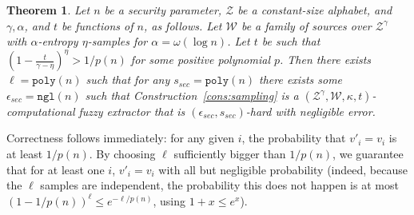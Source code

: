 \documentclass[11pt]{article}
\newtheorem{theorem}{Theorem}[section]
\newcommand{\consref}[1]{\mbox{Construction~\ref{#1}}}
\newcommand{\poly}{\ensuremath{\mathtt{poly}}\xspace}
\newcommand{\ngl}{\ensuremath{\mathtt{ngl}}\xspace}
\newcommand{\Huse}{\mathrm{H}_{\mathtt{usable}}}
\newcommand{\subsetEntropy}{\alpha}
\begin{document}
\noindent


\begin{theorem}
\label{thm:sampling}
Let $n$ be a security parameter, $\mathcal{Z}$ be a constant-size alphabet, and $\gamma, \subsetEntropy$, and $t$ be functions of $n$, as follows.  Let $\mathcal{W}$ be a family of sources over $\mathcal{Z}^\gamma$ with $\alpha$-entropy $\eta$-samples for $\subsetEntropy = \omega(\log n)$. Let $t$ be such that $\left(1-\frac{t}{\gamma-\eta}\right)^\eta>1/p(n)$ for some positive polynomial $p$. Then there exists $\ell = \poly(n)$ such that for any
$s_{sec} = \poly(n)$ there exists some $\epsilon_{sec} = \ngl(n)$ such that \consref{cons:sampling} is a $(\mathcal{Z}^\gamma, \mathcal{W}, \kappa, t)$-computational fuzzy extractor that is $\left (\epsilon_{sec}, s_{sec}\right)$-hard with negligible error.
\end{theorem}
 
 Correctness follows immediately: for any given $i$, the probability that $v'_i=v_i$ is at least $1/p(n)$. By choosing $\ell$ sufficiently bigger than $1/p(n)$, we guarantee that for at least one $i$,  $v'_i=v_i$ with all but negligible probability
(indeed, because the $\ell$ samples are independent, the probability this does not happen is at most $(1-1/p(n))^\ell \le e^{-\ell/p(n)}$, using $1+x \le e^x$).
\end{document}

